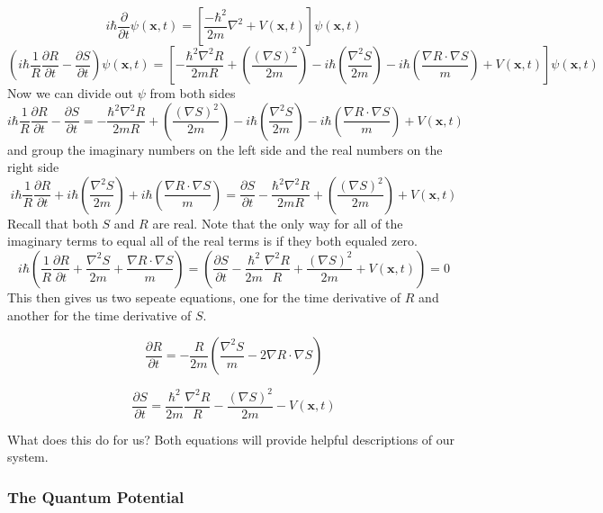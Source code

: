 $$
i\hbar\frac{\partial}{\partial t} \psi(\mathbf{x},t) = \left [ \frac{-\hbar^2}{2 m}\nabla^2 + V(\mathbf{x},t)\right ] \psi(\mathbf{x},t)
$$
$$
\left(i \hbar \frac{1}{R} \frac{\partial R}{\partial t} - \frac{\partial S}{\partial t}\right) \psi(\mathbf{x},t) =\left [-\frac{\hbar^2  \nabla^2 R}{2 m R} + \left(\frac{(\nabla S)^2}{2 m}\right)  - i \hbar \left(\frac{\nabla^2 S}{2 m}\right) - i \hbar \left(\frac{\nabla R \cdot \nabla S}{m}\right) + V(\mathbf{x},t) \right]\psi(\mathbf{x},t) 
$$
Now we can divide out $\psi$ from both sides
$$ 
i \hbar \frac{1}{R} \frac{\partial R}{\partial t} - \frac{\partial S}{\partial t} = -\frac{\hbar^2  \nabla^2 R}{2 m R} + \left(\frac{(\nabla S)^2}{2 m}\right)  - i \hbar \left(\frac{\nabla^2 S}{2 m}\right) - i \hbar \left(\frac{\nabla R \cdot \nabla S}{m}\right) + V(\mathbf{x},t)
$$
and group the imaginary numbers on the left side and the real numbers on the right side 
$$ i \hbar \frac{1}{R} \frac{\partial R}{\partial t} + i \hbar \left(\frac{\nabla^2 S}{2 m}\right) + i \hbar \left(\frac{\nabla R \cdot \nabla S}{m}\right) = \frac{\partial S}{\partial t} -\frac{\hbar^2  \nabla^2 R}{2 m R} + \left(\frac{(\nabla S)^2}{2 m}\right)  + V(\mathbf{x},t)
$$
Recall that both $S$ and $R$ are real. Note that the only way for all of the imaginary terms to equal all of the real terms is if they both equaled zero.
$$i \hbar \left(\frac{1}{R} \frac{\partial R}{\partial t} + \frac{\nabla^2 S}{2 m} + \frac{\nabla R \cdot \nabla S}{m}\right) = \left(\frac{\partial S}{\partial t} -\frac{\hbar^2}{2m}\frac{\nabla^2 R}{R} + \frac{(\nabla S)^2}{2 m}  + V(\mathbf{x},t) \right) = 0
$$
This then gives us two sepeate equations, one for the time derivative of $R$ and another for the time derivative of $S$.

\begin{equation}
\label{dR/dt}
\frac{\partial R}{\partial t} = -\frac{R}{2 m}\left(\frac{\nabla^2 S}{m}-2\nabla R \cdot \nabla S\right)
\end{equation}


\begin{equation}
\label{dS/dt}
\frac{\partial S}{\partial t} = \frac{\hbar^2}{2m}\frac{\nabla^2 R}{R} - \frac{(\nabla S)^2}{2 m} - V(\mathbf{x},t)
\end{equation}

What does this do for us? Both equations will provide helpful descriptions of our system.

\subsubsection{The Quantum Potential}

